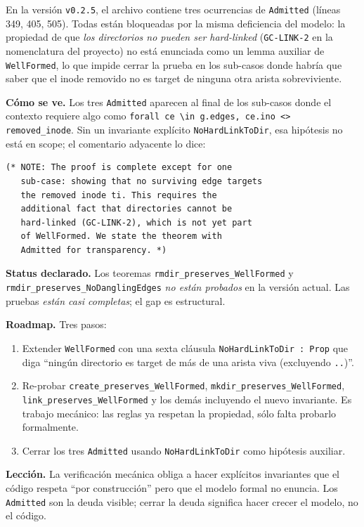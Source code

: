 \begin{trampa}
\label{tr:coq-admitted}
En la versión \texttt{v0.2.5}, el archivo  contiene
tres ocurrencias de \texttt{Admitted} (líneas 349, 405, 505). Todas
están bloqueadas por la misma deficiencia del modelo: la propiedad de
que \emph{los directorios no pueden ser hard-linked} (\texttt{GC-LINK-2}
en la nomenclatura del proyecto) no está enunciada como un lemma
auxiliar de \texttt{WellFormed}, lo que impide cerrar la prueba en los
sub-casos donde habría que saber que el inode removido no es target de
ninguna otra arista \econtains{} sobreviviente.

\textbf{Cómo se ve.} Los tres \texttt{Admitted} aparecen al final de
los sub-casos donde el contexto requiere algo como
\texttt{forall ce \textbackslash in g.edges, ce.ino <> removed\_inode}.
Sin un invariante explícito \texttt{NoHardLinkToDir}, esa hipótesis no
está en scope; el comentario adyacente lo dice:

\begin{lstlisting}[language=coq]
(* NOTE: The proof is complete except for one
   sub-case: showing that no surviving edge targets
   the removed inode ti. This requires the
   additional fact that directories cannot be
   hard-linked (GC-LINK-2), which is not yet part
   of WellFormed. We state the theorem with
   Admitted for transparency. *)
\end{lstlisting}

\textbf{Status declarado.} Los teoremas
\texttt{rmdir\_preserves\_WellFormed} y
\texttt{rmdir\_preserves\_NoDanglingEdges} \emph{no están probados}
en la versión actual. Las pruebas \emph{están casi completas}; el
gap es estructural.

\textbf{Roadmap.} Tres pasos:
\begin{enumerate}
  \item Extender \texttt{WellFormed} con una sexta cláusula
    \texttt{NoHardLinkToDir : Prop} que diga ``ningún directorio es
    target de más de una arista \econtains{} viva (excluyendo
    \texttt{..})''.
  \item Re-probar \texttt{create\_preserves\_WellFormed},
    \texttt{mkdir\_preserves\_WellFormed},
    \texttt{link\_preserves\_WellFormed} y los demás incluyendo el
    nuevo invariante. Es trabajo mecánico: las reglas ya respetan
    la propiedad, sólo falta probarlo formalmente.
  \item Cerrar los tres \texttt{Admitted} usando
    \texttt{NoHardLinkToDir} como hipótesis auxiliar.
\end{enumerate}

\textbf{Lección.} La verificación mecánica obliga a hacer explícitos
invariantes que el código respeta ``por construcción'' pero que el
modelo formal no enuncia. Los \texttt{Admitted} son la deuda visible;
cerrar la deuda significa hacer crecer el modelo, no el código.
\end{trampa}

